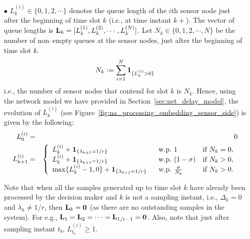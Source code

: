 \documentclass[acmtosn]{acmtrans2m}
\begin{document}
\begin{itemize}
\item[$\bullet$] $L_k^{(i)} \in \{0,1,2,\cdots\}$ denotes the queue 
     length of the $i$th sensor node just after the beginning of time 
     slot $k$ (i.e., at time instant $k+$). The vector of queue lengths is 
     ${\bf L}_k = [L_k^{(1)}, L_k^{(2)}, \cdots, L_k^{(N)}]$.
     Let $N_k \in \{0,1,2,\cdots,N\}$ be the number of non--empty
     queues at the sensor nodes, just after the beginning of time slot $k$.
     \[N_k := \sum_{i=1}^N {\bf 1}_{\{L_k^{(i)}>0\}}\] 
     i.e., the number of sensor nodes that contend for slot $k$ is $N_k$.
     Hence, using the network model we have provided in Section~\ref{sec:net_delay_model},
     the evolution of $L_k^{(i)}$ (see Figure~\ref{fig:na_processing_embedding_sensor_side})
     is given by the following: 
\setlength{\extrarowheight}{0.3cm}
     \begin{eqnarray*}
     L_0^{(i)} & = & 0 \\ 
     L_{k+1}^{(i)} & = & \left\{
                         \begin{array}{lll} 
                         L_{k}^{(i)} + {\bf 1}_{\{\lambda_{k+1}=1/r\}} & \ \ \mathrm{w.p.} \ 1 & \text{if} \ N_k = 0, \\  
                         L_{k}^{(i)} + {\bf 1}_{\{\lambda_{k+1}=1/r\}} & \ \ \mathrm{w.p.} \ (1-\sigma) & \text{if} \ N_k > 0,\\  
                         \max\{L_{k}^{(i)}-1,0\} + {\bf 1}_{\{\lambda_{k+1}=1/r\}} & \ \ \mathrm{w.p.} \ \frac{\sigma}{N_{k}} & \text{if} \ N_k > 0.  
                         \end{array}
     \right. 
     \end{eqnarray*}

\setlength{\extrarowheight}{-0.3cm}
     Note that when all the samples generated up to time slot $k$ have already been processed by the 
     decision maker and $k$ is not a sampling instant, i.e., $\Delta_k = 0$ and 
     $\lambda_{k} \neq 1/r$, then ${\bf L}_k = {\bf 0}$ (as there are no outstanding 
     samples in the system). For e.g., ${\bf L}_1 = {\bf L}_2 = \cdots = 
     {\bf L}_{1/r-1} = {\bf 0}$. Also, note that just after sampling instant $t_b$, $L_{t_b}^{(i)} \geqslant 1$.



\end{itemize}
\end{document}
